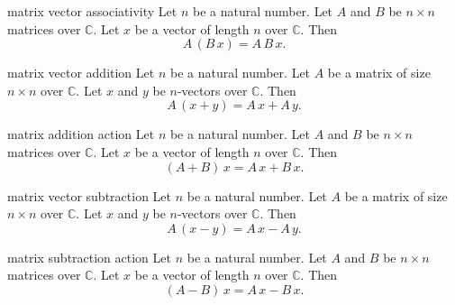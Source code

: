\begin{cleanresult}{matrix vector associativity}
Let $n$ be a natural number.
Let $A$ and $B$ be $n\times n$ matrices over $\mathbb{C}$.
Let $x$ be a vector of length $n$ over $\mathbb{C}$.
Then \[A\,\left(B\,x\right)=A\,B\,x.\]
\end{cleanresult}

\begin{cleanresult}{matrix vector addition}
Let $n$ be a natural number.
Let $A$ be a matrix of size $n\times n$ over $\mathbb{C}$.
Let $x$ and $y$ be $n$-vectors over $\mathbb{C}$.
Then \[A\,\left(x+y\right)=A\,x+A\,y.\]
\end{cleanresult}

\begin{cleanresult}{matrix addition action}
Let $n$ be a natural number.
Let $A$ and $B$ be $n\times n$ matrices over $\mathbb{C}$.
Let $x$ be a vector of length $n$ over $\mathbb{C}$.
Then \[\left(A+B\right)\,x=A\,x+B\,x.\]
\end{cleanresult}

\begin{cleanresult}{matrix vector subtraction}
Let $n$ be a natural number.
Let $A$ be a matrix of size $n\times n$ over $\mathbb{C}$.
Let $x$ and $y$ be $n$-vectors over $\mathbb{C}$.
Then \[A\,\left(x-y\right)=A\,x-A\,y.\]
\end{cleanresult}

\begin{cleanresult}{matrix subtraction action}
Let $n$ be a natural number.
Let $A$ and $B$ be $n\times n$ matrices over $\mathbb{C}$.
Let $x$ be a vector of length $n$ over $\mathbb{C}$.
Then \[\left(A-B\right)\,x=A\,x-B\,x.\]
\end{cleanresult}

